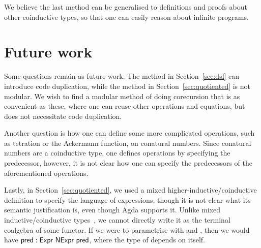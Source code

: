 \documentclass[sigplan, screen, natbib=false, review]{acmart}
\begin{document}
We believe the last method can be generalised to definitions and proofs about
other coinductive types, so that one can easily reason about infinite programs.

\section{Future work}

Some questions remain as future work. The method in Section~\ref{sec:dsl} can
introduce code duplication, while the method in Section~\ref{sec:quotiented} is
not modular. We wish to find a modular method of doing corecursion that is as
convenient as these, where one can reuse other operations and equations, but
does not necessitate code duplication.

Another question is how one can define some more complicated operations, such as
tetration or the Ackermann function, on conatural numbers. Since conatural
numbers are a coinductive type, one defines operations by specifying the
predecessor, however, it is not clear how one can specify the predecessors of
the aforementioned operations.

Lastly, in Section~\ref{sec:quotiented}, we used a mixed
higher-inductive/coinductive definition to specify the language of expressions,
though it is not clear what its semantic justification is, even though Agda
supports it. Unlike mixed inductive/coinductive types~\cite{hancock-stream}, we
cannot directly write it as the terminal coalgebra of some functor. If we were
to parametrise  with  and ,
then we would have $ : \AgdaDatatype{Expr}\ \AgdaRecord{NExpr}\
\AgdaField{pred}$, where the type of \AgdaField{pred} depends on itself.

\printbibliography
\end{document}
